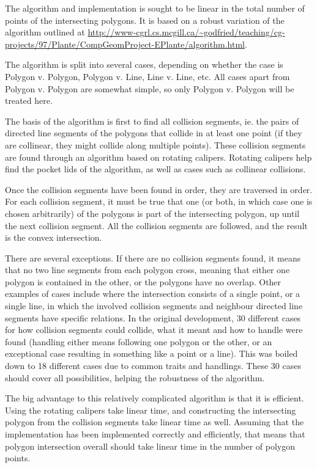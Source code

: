 The algorithm and implementation is sought to be linear in the total number
of points of the intersecting polygons. It is based on a robust variation of the algorithm outlined at
\url{http://www-cgrl.cs.mcgill.ca/~godfried/teaching/cg-projects/97/Plante/CompGeomProject-EPlante/algorithm.html}.

The algorithm is split into several cases, depending on whether the case is Polygon v. Polygon, Polygon v. Line,
Line v. Line, etc. All cases apart from Polygon v. Polygon are somewhat simple, so only Polygon v. Polygon will
be treated here.

The basis of the algorithm is first to find all collision segments, ie. the pairs of directed line segments
of the polygons that collide in at least one point (if they are collinear, they might collide along multiple points).
These collision segments are found through an algorithm based on rotating calipers.
Rotating calipers help find the pocket lids of the algorithm, as well as cases such as collinear collisions.

Once the collision segments have been found in order, they are traversed in order. For each collision segment,
it must be true that one (or both, in which case one is chosen arbitrarily) of the polygons is part of the
intersecting polygon, up until the next collision segment. All the collision segments are followed,
and the result is the convex intersection.

There are several exceptions. If there are no collision segments found, it means that no two line segments
from each polygon cross, meaning that either one polygon is contained in the other, or the polygons
have no overlap. Other examples of cases include where the intersection consists of a single point, or a single line,
in which the involved collision segments and neighbour directed line segments have specific relations.
In the original development, 30 different cases for how collision segments could collide, what it meant and
how to handle were found (handling either means following one polygon or the other, or an exceptional case resulting
in something like a point or a line). This was boiled down to 18 different cases due to common traits and handlings.
These 30 cases should cover all possibilities, helping the robustness of the algorithm.

The big advantage to this relatively complicated algorithm is that it is efficient.
Using the rotating calipers take linear time, and constructing the intersecting polygon from
the collision segments take linear time as well. Assuming that the implementation
has been implemented correctly and efficiently, that means that polygon intersection overall
should take linear time in the number of polygon points.

